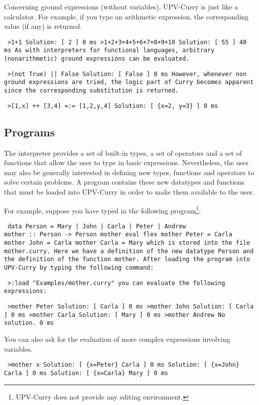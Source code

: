 \documentclass[titlepage,fleqn]{article}
\makeatletter
\newenvironment{prog}{\vspace{0.7ex}\par
\setlength{\parindent}{0.7cm}
\obeylines\@vobeyspaces\tt}
{\vspace{0.7ex}\noindent}
\newcommand{\iniprog}{\begin{prog}}
\newcommand{\finprog}{\end{prog}\noindent}
\newcommand{\pr}[1]{\mbox{\tt #1}}   %
\newcommand{\prompt}{\pr{>}}
\makeatother
\begin{document}
Concerning ground expressions (without variables), 
UPV-Curry is just like a calculator. 
For example, if you type
an arithmetic expression, the corresponding value (if any) is returned.
\iniprog
\prompt 1+1
Solution: [ 2 ] 0 ms
\prompt 1+2+3+4+5+6+7+8+9+10
Solution: [ 55 ] 40 ms
\finprog
As with interpreters for functional languages, 
arbitrary (nonarithmetic) ground expressions can be evaluated.
\iniprog
\prompt (not True) || False
Solution: [ False ] 0 ms
\finprog
However, whenever non ground expressions are tried, the logic part of Curry 
becomes apparent since 
the corresponding substitution is returned.
\iniprog
\prompt [1,x] ++ [3,4] =:= [1,2,y,4]
Solution: [ \{x=2, y=3\} ] 0 ms
\finprog

\subsection{Programs}

The interpreter provides a set of built-in types, a set of operators and 
a set of functions
that allow the user to type in basic expressions. 
Nevertheless, the user
may also be generally interested in defining new types, functions and operators 
to solve certain problems.
A program contains these new datatypes and functions that must
be loaded into UPV-Curry in order to make them available to the user.

For example, suppose you have typed in the following program\footnote{
UPV-Curry does not provide any editing environment.}:
\iniprog
data Person = Mary | John | Carla | Peter | Andrew\\

mother :: Person -> Person
mother eval flex
mother Peter = Carla
mother John  = Carla
mother Carla = Mary
\finprog
which is  stored into the file \pr{mother.curry}.
Here we have a definition of the new datatype \pr{Person} and 
the definition of
the function \pr{mother}. 
After loading the program into UPV-Curry by typing the following command:
\iniprog
\prompt :load "Examples/mother.curry"
\finprog
you can evaluate the following expressions:
\iniprog
\prompt mother Peter
Solution: [ Carla ] 0 ms
\prompt mother John
Solution: [ Carla ] 0 ms
\prompt mother Carla
Solution: [ Mary ] 0 ms
\prompt mother Andrew
No solution. 0 ms
\finprog

You can also ask for the evaluation of more complex
expressions involving variables.
\iniprog
\prompt mother x
Solution: [ \{x=Peter\} Carla ] 0 ms
Solution: [ \{x=John\} Carla ] 0 ms
Solution: [ \{x=Carla\} Mary ] 0 ms
\finprog
\end{document}

